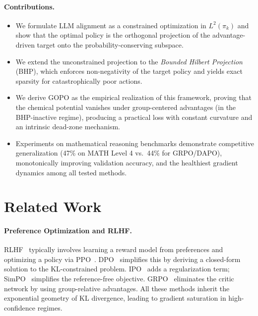 \documentclass[11pt]{article}
\theoremstyle{definition}
\theoremstyle{remark}
\newcommand{\pik}{\pi_k}
\begin{document}
\paragraph{Contributions.}
\begin{itemize}[leftmargin=2em]
    \item We formulate LLM alignment as a constrained optimization in $L^2(\pik)$ and show that the optimal policy is the orthogonal projection of the advantage-driven target onto the probability-conserving subspace.
    \item We extend the unconstrained projection to the \emph{Bounded Hilbert Projection} (BHP), which enforces non-negativity of the target policy and yields exact sparsity for catastrophically poor actions.
    \item We derive GOPO as the empirical realization of this framework, proving that the chemical potential vanishes under group-centered advantages (in the BHP-inactive regime), producing a practical loss with constant curvature and an intrinsic dead-zone mechanism.
    \item Experiments on mathematical reasoning benchmarks demonstrate competitive generalization (47\% on MATH Level 4 vs.\ 44\% for GRPO/DAPO), monotonically improving validation accuracy, and the healthiest gradient dynamics among all tested methods.
\end{itemize}

\section{Related Work}
\label{sec:related}

\paragraph{Preference Optimization and RLHF.}
RLHF~\cite{Christiano2017RLHF,Ouyang2022InstructGPT} typically involves learning a reward model from preferences and optimizing a policy via PPO~\cite{Schulman2017PPO}. DPO~\cite{Rafailov2023DPO} simplifies this by deriving a closed-form solution to the KL-constrained problem. IPO~\cite{Azar2024IPO} adds a regularization term; SimPO~\cite{Meng2024SimPO} simplifies the reference-free objective. GRPO~\cite{Shao2024GRPO} eliminates the critic network by using group-relative advantages. All these methods inherit the exponential geometry of KL divergence, leading to gradient saturation in high-confidence regimes.
\end{document}
